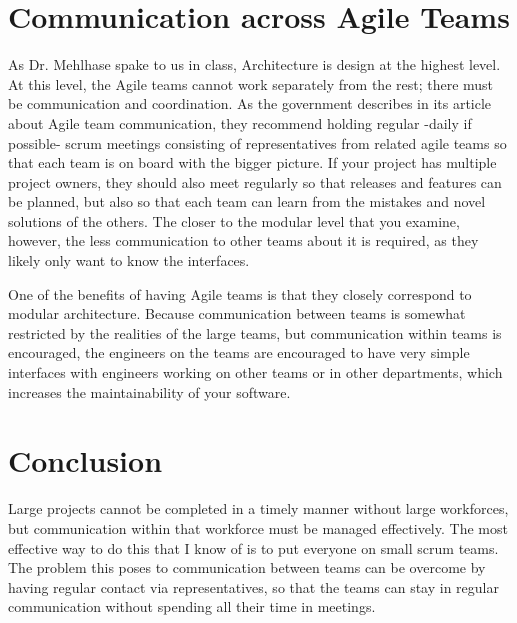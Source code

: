 \documentclass[sigplan,screen]{acmart}
\begin{document}
\section{Communication across Agile Teams}
As Dr. Mehlhase spake to us in class, Architecture is design at the highest level. At this level, the Agile teams cannot work separately from the rest; there must be communication and coordination. As the government describes in its article about Agile team communication, they recommend holding regular -daily if possible- scrum meetings consisting of representatives from related agile teams so that each team is on board with the bigger picture. \cite{Lulit} If your project has multiple project owners, they should also meet regularly so that releases and features can be planned, but also so that each team can learn from the mistakes and novel solutions of the others. \cite{Lulit} The closer to the modular level that you examine, however, the less communication to other teams about it is required, as they likely only want to know the interfaces.

One of the benefits of having Agile teams is that they closely correspond to modular architecture. Because communication between teams is somewhat restricted by the realities of the large teams, but communication within teams is encouraged, the engineers on the teams are encouraged to have very simple interfaces with engineers working on other teams or in other departments, which increases the maintainability of your software.

\section{Conclusion}
Large projects cannot be completed in a timely manner without large workforces, but communication within that workforce must be managed effectively. The most effective way to do this that I know of is to put everyone on small scrum teams. The problem this poses to communication between teams can be overcome by having regular contact via representatives, so that the teams can stay in regular communication without spending all their time in meetings.





\end{document}
